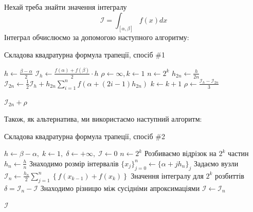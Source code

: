 \documentclass[12pt]{extarticle}
\begin{document}
Нехай треба знайти значення інтегралу
\[
\mathcal{I} = \int_{[\alpha,\beta]}f(x)dx
\]
Інтеграл обчислюємо за допомогою наступного алгоритму:
\begin{algorithm}
\caption{Складова квадратурна формула трапеції, спосіб \#1}\label{alg:cap}
\begin{algorithmic}
\State $h \gets \frac{\beta-\alpha}{2}$
\State $\mathcal{I}_h \gets \frac{f(\alpha)+f(\beta)}{2}\cdot h$
\State $\rho \gets \infty, k \gets 1$
\For{$\left|\rho\right| > \varepsilon$}
    \State $n \gets 2^k$
    \State $h_{2n} \gets \frac{h}{2n}$
    \State $\mathcal{I}_{2n} \gets \frac{1}{2}\mathcal{I}_h + h_{2n}\sum_{i=1}^n f\left(\alpha+(2i-1)h_{2n}\right)$
    \State $k \gets k+1$
    \State $\rho \gets \frac{\mathcal{I}_h-\mathcal{I}_{2n}}{3}$
\EndFor

\Return $\mathcal{I}_{2n} + \rho$
\end{algorithmic}
\end{algorithm}

Також, як альтернатива, ми використаємо наступний алгоритм:

\begin{algorithm}
\caption{Складова квадратурна формула трапеції, спосіб \#2}\label{alg:cap}
\begin{algorithmic}
\State $h \gets \beta - \alpha,\; k \gets 1,\; \delta \gets +\infty,\; \mathcal{I} \gets 0$
\For{$|\delta| > \varepsilon$}
    \State $n \gets 2^k$ 
    \Comment Розбиваємо відрізок на $2^k$ частин
    \State $h_n \gets \frac{h}{n}$
    \Comment Знаходимо розмір інтервалів
    \State $\{x_j\}_{j=0}^n \gets \{\alpha + jh_n\}_{j}$
    \Comment Задаємо вузли
    \State $\mathcal{I}_n \gets \frac{h_n}{2}\sum_{j=1}^n \left\{f(x_{k-1})+f(x_k)\right\}$
    \Comment Значення інтегралу для $2^k$ розбиттів
    \State $\delta = \mathcal{I}_n - \mathcal{I}$
    \Comment Знаходимо різницю між сусідніми апроксимаціями
    \State $\mathcal{I} \gets \mathcal{I}_n$
\EndFor

\Return $\mathcal{I}$
\end{algorithmic}
\end{algorithm}
\end{document}

